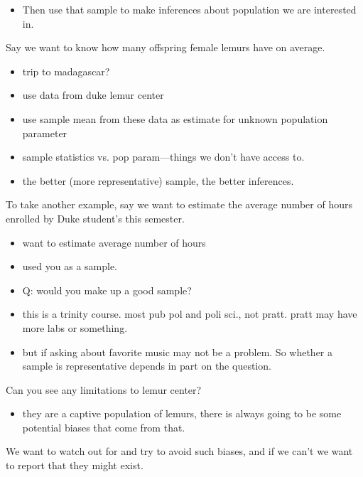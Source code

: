 \documentclass[11pt,containsverbatim,handout,xcolor=xelatex,dvipsnames,table]{beamer}
\begin{document}
\begin{frame}
{\begin{itemize}
\item Then use that sample to make inferences about population we are interested in.

\end{itemize}

Say we want to know how many offspring female lemurs have on average.
\begin{itemize}

\item trip to madagascar?

\item use data from duke lemur center

\item use sample mean from these data as estimate for unknown population parameter

\item sample statistics vs. pop param---things we don't have access to.

\item the better (more representative) sample, the better inferences.

\end{itemize}

To take another example, say we want to estimate the average number of hours enrolled by Duke student's this semester.
\begin{itemize}

\item want to estimate average number of hours

\item used you as a sample.

\item Q: would you make up a good sample?

\item  this is a trinity course.  most pub pol and poli sci., not pratt.
pratt may have more labs or something.

\item but if asking about favorite music may not be a problem.  So whether a sample is representative depends in part on the question.

\end{itemize}

Can you see any limitations to lemur center?
\begin{itemize}
\item they are a captive population of lemurs, there is always going to be some
potential biases that come from that.
\end{itemize}

We want to watch out for and try to avoid such biases, and if we can't we want to report that they might exist.

}

\end{frame}
\end{document}
